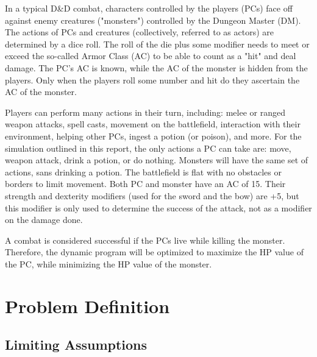 \documentclass[letterpaper, 10 pt, conference]{ieeeconf}
\begin{document}
In a typical D\&D combat, characters controlled by the players (PCs) face off against enemy creatures ("monsters") controlled by the Dungeon Master (DM). The actions of PCs and creatures (collectively,
referred to as actors) are determined by a dice roll. The roll of the die plus some modifier needs to meet or exceed the so-called Armor Class (AC) to be able to count as a "hit"
and deal damage. The PC's AC is known, while the AC of the monster is hidden from the players. Only when the players roll some number and hit do they ascertain the AC of the monster.

Players can perform many actions in their turn, including: melee or ranged weapon attacks, spell casts, movement on the battlefield, interaction with their environment, helping other
PCs, ingest a potion (or poison), and more. For the simulation outlined in this report, the only actions a PC can take are: move, weapon attack, drink a potion, or do nothing. Monsters 
will have the same set of actions, sans drinking a potion. The battlefield is flat with no obstacles or borders to limit movement. Both PC and monster have an AC of 15. Their strength and dexterity modifiers (used
for the sword and the bow) are +5, but this modifier is only used to determine the success of the attack, not as a modifier on the damage done.

A combat is considered successful if the PCs live while killing the monster. Therefore, the dynamic program will be optimized to maximize the HP value of the PC, while minimizing the HP
value of the monster. 

\section{Problem Definition}\label{sec:pblm_def}
\subsection{Limiting Assumptions}
\end{document}
